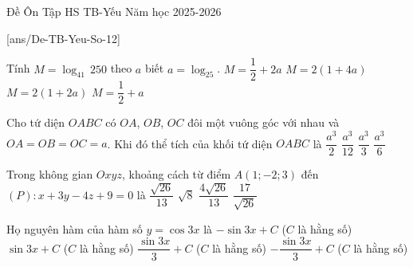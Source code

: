 \begin{name}
{Đề Ôn Tập HS TB-Yếu}
{Năm học 2025-2026}
\end{name}

[ans/De-TB-Yeu-So-12]
\TN
\begin{ex}%
Tính $M=\log _41\,250$ theo $a$ biết $a=\log _25$.
\choice
{\True $M=\dfrac{1}{2}+2a$}
{$M=2\left(1+4a\right)$}
{$M=2\left(1+2a\right)$}
{$M=\dfrac{1}{2}+a$}
\end{ex}

\begin{ex}%
Cho tứ diện $OABC$ có $OA$, $OB$, $OC$ đôi một vuông góc với nhau và $OA=OB=OC=a$. Khi đó thể tích của khối tứ diện $OABC$ là
\choice
{$\dfrac{a^3}{2}$}
{$\dfrac{a^3}{12}$}
{$\dfrac{a^3}{3}$}
{\True $\dfrac{a^3}{6}$}
\end{ex}

\begin{ex}%
Trong không gian $Oxyz$, khoảng cách từ điểm $A\left(1;-2;3\right)$ đến $\left(P\right)\colon x+3y-4z+9=0$ là
\choice
{$\dfrac{\sqrt{26}}{13}$}
{$\sqrt{8}$}
{\True $\dfrac{4\sqrt{26}}{13}$}
{$\dfrac{17}{\sqrt{26}}$}
\end{ex}

\begin{ex}%
Họ nguyên hàm của hàm số $y=\cos 3x$ là
\choice
{$-\sin 3x+C$ ($C$ là hằng số)}
{$\sin 3x+C$ ($C$ là hằng số)}
{\True $\dfrac{\sin 3x}{3}+C$ ($C$ là hằng số)}
{$-\dfrac{\sin 3x}{3}+C$ ($C$ là hằng số)}
\end{ex}

